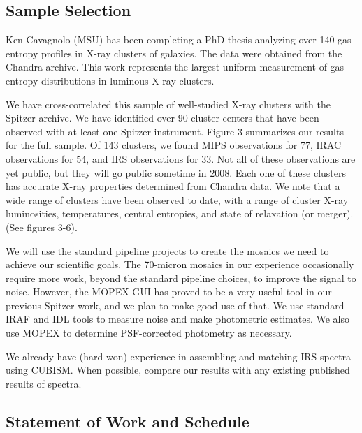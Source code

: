 \documentclass[letterpaper,12pt]{article}
\begin{document}
\subsection{Sample Selection}

Ken Cavagnolo (MSU) has been completing a PhD thesis analyzing over 140
gas entropy profiles in X-ray clusters of galaxies. The data were obtained
from the Chandra archive. This work represents the largest uniform measurement
of gas entropy distributions in luminous X-ray clusters. 

We have cross-correlated this sample of well-studied X-ray clusters with
the Spitzer archive. We have identified over 90 cluster centers that have
been observed with at least one Spitzer instrument. Figure 3 summarizes our
results for the full sample. Of 143 clusters, we found MIPS observations for
77, IRAC observations for 54, and IRS observations for 33. Not all of these
observations are yet public, but they will go public sometime in 2008. 
Each one of these clusters
has accurate X-ray properties determined from Chandra data. We note that a
wide range of clusters have been observed to date, with a range of cluster
X-ray luminosities, temperatures, central entropies, and state of 
relaxation (or merger). (See figures 3-6).

We will use the standard pipeline projects to create the mosaics we need to
achieve our scientific goals. The 70-micron mosaics in our experience occasionally
require more work, beyond the standard pipeline choices, to improve the signal to noise.
However, the MOPEX GUI has proved to be a very useful tool in our previous Spitzer
work, and we plan to make good use of that. We use standard IRAF and IDL tools to
measure noise and make photometric estimates. We also use MOPEX to determine PSF-corrected
photometry as necessary. 

We already have (hard-won) experience in assembling and matching IRS spectra using
CUBISM. When possible, compare our results with any existing published results of spectra.


\subsection{Statement of Work and Schedule}
\end{document}
